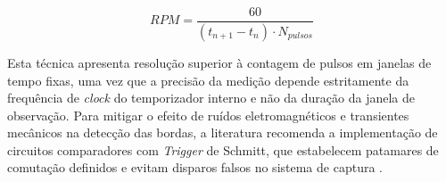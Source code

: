 \begin{equation}
    RPM = \frac{60}{(t_{n+1} - t_n) \cdot N_{pulsos}}
    \label{eq:input_capture_rpm}
\end{equation}

Esta técnica apresenta resolução superior à contagem de pulsos em janelas de tempo fixas, uma vez que a precisão da medição depende estritamente da frequência de \textit{clock} do temporizador interno e não da duração da janela de observação. Para mitigar o efeito de ruídos eletromagnéticos e transientes mecânicos na detecção das bordas, a literatura recomenda a implementação de circuitos comparadores com \textit{Trigger} de Schmitt, que estabelecem patamares de comutação definidos e evitam disparos falsos no sistema de captura \cite{Tocci2017}.

\newpage

